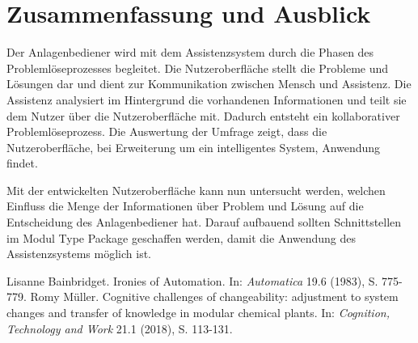 \documentclass{ifaPoster}
\begin{document}


\section{Zusammenfassung und Ausblick}
Der Anlagenbediener wird mit dem Assistenzsystem durch die Phasen des Problemlöseprozesses begleitet. Die Nutzeroberfläche stellt die Probleme und Lösungen dar und dient zur Kommunikation zwischen Mensch und Assistenz. Die Assistenz analysiert im Hintergrund die vorhandenen Informationen und teilt sie dem Nutzer über die Nutzeroberfläche mit. Dadurch entsteht ein kollaborativer Problemlöseprozess. Die Auswertung der Umfrage zeigt, dass die Nutzeroberfläche, bei Erweiterung um ein intelligentes System, Anwendung findet.

Mit der entwickelten Nutzeroberfläche kann nun untersucht werden, welchen Einfluss die Menge der Informationen über Problem und Lösung auf die Entscheidung des Anlagenbediener hat. Darauf aufbauend sollten Schnittstellen im Modul Type Package geschaffen werden, damit die Anwendung des Assistenzsystems möglich ist.

\vspace{8pt}
 {\tiny\renewcommand{\section}[2]{}%
 	 \begin{thebibliography}{8.5}
 	 	Lisanne Bainbridget. {\glqq Ironies of Automation\grqq}. {In: \textit{Automatica}} 19.6 (1983), S. 775-779.
 	 Romy Müller. {\glqq Cognitive challenges of changeability: adjustment
to system changes and transfer of knowledge in modular
chemical plants\grqq}. {In: \textit{Cognition, Technology and Work}} 21.1 (2018), S. 113-131.
	\end{thebibliography}}
	
\end{document}
